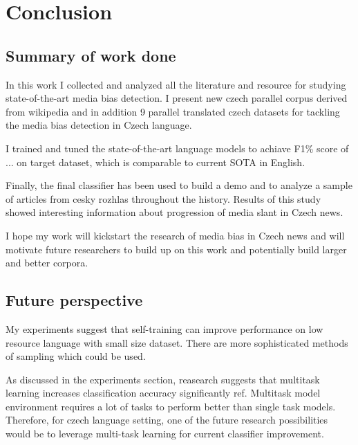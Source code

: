 \chapter{Conclusion}
\section{Summary of work done}
In this work I collected and analyzed all the literature and resource for studying state-of-the-art media bias detection. I present new czech parallel corpus derived from wikipedia and in addition 9 parallel translated czech datasets for tackling the media bias detection in Czech language.

I trained and tuned the state-of-the-art language models to achiave F1\% score of ... on target dataset, which is comparable to current SOTA in English.

Finally, the final classifier has been used to build a demo and to analyze a sample of articles from cesky rozhlas throughout the history. Results of this study showed interesting information about progression of media slant in Czech news.

I hope my work will kickstart the research of media bias in Czech news and will motivate future researchers to build up on this work and potentially build larger and better corpora.


\section{Future perspective}
My experiments suggest that self-training can improve performance on low resource language with small size dataset. There are more sophisticated methods of sampling which could be used.

As discussed in the experiments section, reasearch suggests that multitask learning increases classification accuracy significantly ref. Multitask model environment requires a lot of tasks \cite{aribandi2021ext5} to perform better than single task models. Therefore, for czech language setting, one of the future research possibilities would be to leverage multi-task learning for current classifier improvement. 